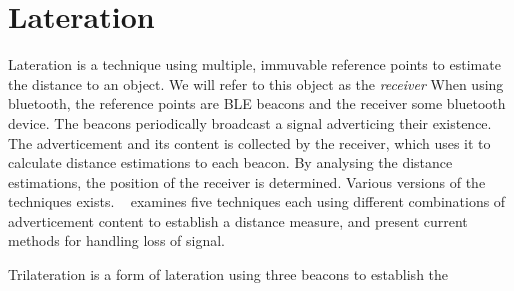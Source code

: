 \section{Lateration}
Lateration is a technique using multiple, immuvable reference points to estimate the distance to an object\cite{presence_ble_review}.
We will refer to this object as the \textit{receiver}   
When using bluetooth, the reference points are BLE beacons and the receiver some bluetooth device. 
The beacons periodically broadcast a signal adverticing their existence. 
The adverticement and its content is collected by the receiver, which uses it to calculate distance estimations to each beacon. 
By analysing the distance estimations, the position of the receiver is determined.
Various versions of the techniques exists.
\citeauthor{presence_ble_review}~\cite{presence_ble_review} examines five techniques each using different combinations of adverticement content to establish a distance measure, and present current methods for handling loss of signal.

Trilateration is a form of lateration using three beacons to establish the 
